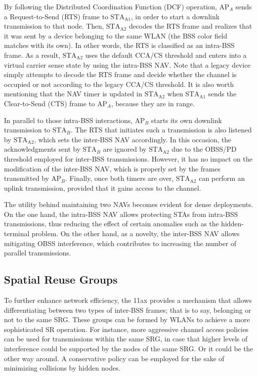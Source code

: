 \documentclass[comsoc]{IEEEtran}
\begin{document}
	By following the Distributed Coordination Function (DCF) operation, $\text{AP}_A$ sends a Request-to-Send (RTS) frame to $\text{STA}_\text{A1}$, in order to start a downlink transmission to that node. Then, $\text{STA}_\text{A2}$ decodes the RTS frame and realizes that it was sent by a device belonging to the same WLAN (the BSS color field matches with its own). In other words, the RTS is classified as an intra-BSS frame. As a result, $\text{STA}_\text{A2}$ uses the default CCA/CS threshold and enters into a virtual carrier sense state by using the intra-BSS NAV. Note that a legacy device simply attempts to decode the RTS frame and decide whether the channel is occupied or not according to the legacy CCA/CS threshold. It is also worth mentioning that the NAV timer is updated in $\text{STA}_\text{A2}$ when $\text{STA}_\text{A1}$ sends the Clear-to-Send (CTS) frame to $\text{AP}_A$, because they are in range. 
	
	In parallel to those intra-BSS interactions, $\text{AP}_B$ starts its own downlink transmission to $\text{STA}_B$. The RTS that initiates such a transmission is also listened by $\text{STA}_\text{A2}$, which sets the inter-BSS NAV accordingly. In this occasion, the acknowledgments sent by $\text{STA}_B$ are ignored by $\text{STA}_\text{A2}$ due to the OBSS/PD threshold employed for inter-BSS transmissions. However, it has no impact on the modification of the inter-BSS NAV, which is properly set by the frames transmitted by $\text{AP}_B$. Finally, once both timers are over, $\text{STA}_\text{A2}$ can perform an uplink transmission, provided that it gains access to the channel.
	
	The utility behind maintaining two NAVs becomes evident for dense deployments. On the one hand, the intra-BSS NAV allows protecting STAs from intra-BSS transmissions, thus reducing the effect of certain anomalies such as the hidden-terminal problem. On the other hand, as a novelty, the inter-BSS NAV allows mitigating OBSS interference, which contributes to increasing the number of parallel transmissions. 
	
	\subsection{Spatial Reuse Groups}
	\label{section:srg}
	To further enhance network efficiency, the 11ax provides a mechanism that allows differentiating between two types of inter-BSS frames; that is to say, belonging or not to the same SRG. These groups can be formed by WLANs to achieve a more sophisticated SR operation. For instance, more aggressive channel access policies can be used for transmissions within the same SRG, in case that higher levels of interference could be supported by the nodes of the same SRG. Or it could be the other way around. A conservative policy can be employed for the sake of minimizing collisions by hidden nodes. 
	
\end{document}
